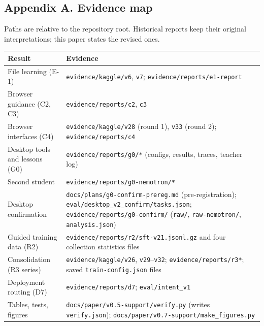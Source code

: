 \documentclass[
  10pt,
]{article}
\newcounter{none} %
\begin{document}
\normalsize

\subsection{Appendix A. Evidence map}\label{appendix-a.-evidence-map}

Paths are relative to the repository root. Historical reports keep their
original interpretations; this paper states the revised ones.

{\def\LTcaptype{none} %
\begin{longtable}[]{@{}
  >{\raggedright\arraybackslash}p{}
  >{\raggedright\arraybackslash}p{}@{}}
\toprule\noalign{}
\begin{minipage}[b]{\linewidth}\raggedright
Result
\end{minipage} & \begin{minipage}[b]{\linewidth}\raggedright
Evidence
\end{minipage} \\
\midrule\noalign{}
\endhead
\bottomrule\noalign{}
\endlastfoot
File learning (E-1) & \texttt{evidence/kaggle/v6}, \texttt{v7};
\texttt{evidence/reports/e1-report} \\
Browser guidance (C2, C3) & \texttt{evidence/reports/c2}, \texttt{c3} \\
Browser interfaces (C4) & \texttt{evidence/kaggle/v28} (round 1),
\texttt{v33} (round 2); \texttt{evidence/reports/c4} \\
Desktop tools and lessons (G0) & \texttt{evidence/reports/g0/*}
(configs, results, traces, teacher log) \\
Second student & \texttt{evidence/reports/g0-nemotron/*} \\
Desktop confirmation & \texttt{docs/plans/g0-confirm-prereg.md}
(pre-registration); \texttt{eval/desktop\_v2\_confirm/tasks.json};
\texttt{evidence/reports/g0-confirm/} (\texttt{raw/},
\texttt{raw-nemotron/}, \texttt{analysis.json}) \\
Guided training data (R2) &
\texttt{evidence/reports/r2/sft-v21.jsonl.gz} and four collection
statistics files \\
Consolidation (R3 series) & \texttt{evidence/kaggle/v26},
\texttt{v29}--\texttt{v32}; \texttt{evidence/reports/r3*}; saved
\texttt{train-config.json} files \\
Deployment routing (D7) & \texttt{evidence/reports/d7};
\texttt{eval/intent\_v1} \\
Tables, tests, figures & \texttt{docs/paper/v0.5-support/verify.py}
(writes \texttt{verify.json});
\texttt{docs/paper/v0.7-support/make\_figures.py} \\
\end{longtable}
}
\end{document}

